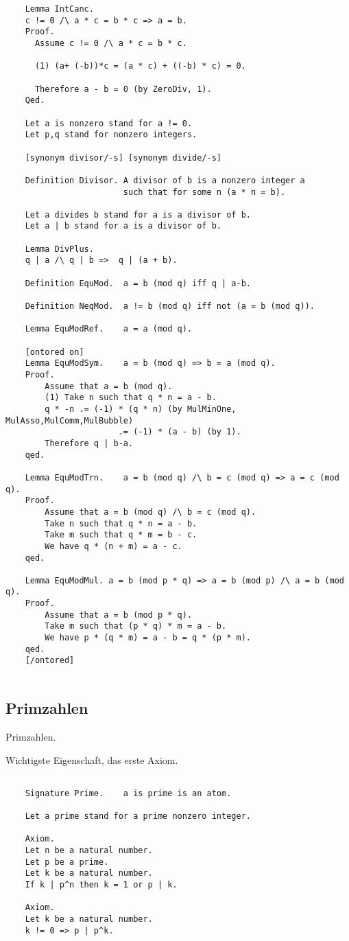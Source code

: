 \documentclass[a4paper,12pt]{scrartcl}
\begin{document}
\begin{lstlisting}
	Lemma IntCanc.
	c != 0 /\ a * c = b * c => a = b.
	Proof.
	  Assume c != 0 /\ a * c = b * c.
	  
	  (1) (a+ (-b))*c = (a * c) + ((-b) * c) = 0.
	  
	  Therefore a - b = 0 (by ZeroDiv, 1).
	Qed.
	
	Let a is nonzero stand for a != 0.
	Let p,q stand for nonzero integers.
	
	[synonym divisor/-s] [synonym divide/-s]
	
	Definition Divisor. A divisor of b is a nonzero integer a
						such that for some n (a * n = b).
	
	Let a divides b stand for a is a divisor of b.
	Let a | b stand for a is a divisor of b.
	
	Lemma DivPlus.
	q | a /\ q | b =>  q | (a + b).
	
	Definition EquMod.  a = b (mod q) iff q | a-b.
	
	Definition NeqMod.  a != b (mod q) iff not (a = b (mod q)).
	
	Lemma EquModRef.    a = a (mod q).
	
	[ontored on]
	Lemma EquModSym.    a = b (mod q) => b = a (mod q).
	Proof.
		Assume that a = b (mod q).
		(1) Take n such that q * n = a - b.
		q * -n .= (-1) * (q * n) (by MulMinOne, MulAsso,MulComm,MulBubble)
					   .= (-1) * (a - b) (by 1).
		Therefore q | b-a.
	qed.
	
	Lemma EquModTrn.    a = b (mod q) /\ b = c (mod q) => a = c (mod q).
	Proof.
		Assume that a = b (mod q) /\ b = c (mod q).
		Take n such that q * n = a - b.
		Take m such that q * m = b - c.
		We have q * (n + m) = a - c.
	qed.
	
	Lemma EquModMul. a = b (mod p * q) => a = b (mod p) /\ a = b (mod q).
	Proof.
		Assume that a = b (mod p * q).
		Take m such that (p * q) * m = a - b.
		We have p * (q * m) = a - b = q * (p * m).
	qed.
	[/ontored]
	
\end{lstlisting}

\subsection{Primzahlen}

Primzahlen.

Wichtigste Eigenschaft, das erste Axiom.

\begin{lstlisting}

	Signature Prime.    a is prime is an atom.
	
	Let a prime stand for a prime nonzero integer.
	
	Axiom.
	Let n be a natural number.
	Let p be a prime.
	Let k be a natural number.
	If k | p^n then k = 1 or p | k.
	
	Axiom.
	Let k be a natural number.
	k != 0 => p | p^k.
	

\end{lstlisting}
\end{document}
